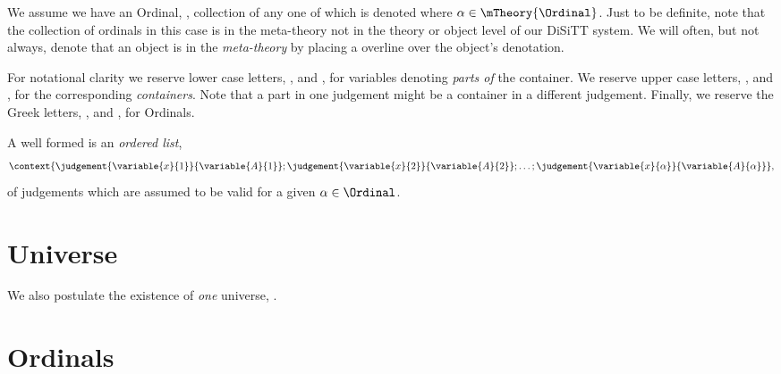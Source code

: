 \documentclass[a4paper,openany]{amsbook}
\begin{document}
We assume we have an Ordinal, \mTheory{\Ordinal}, collection of
 any one of which is denoted  where
$\alpha \in \mTheory{\Ordinal}$. Just to be definite, note that the collection
of ordinals in this case is in the meta-theory not in the theory or object level
of our DiSiTT system. We will often, but not always, denote that an object is in
the \emph{meta-theory} by placing a overline over the object's denotation.

For notational clarity we reserve lower case letters, ,
 and , for variables denoting \emph{parts of} the
container. We reserve upper case letters, ,  and
, for the corresponding \emph{containers}. Note that a part in one
judgement might be a container in a different judgement. Finally, we reserve the
Greek letters, \variable{\alpha}{}, \variable{\beta}{} and \variable{\gamma}{},
for Ordinals.

A well formed  is an \emph{ordered list}, %
\[\context{ %
 \judgement{\variable{x}{1}}{\variable{A}{1}} ; %
 \judgement{\variable{x}{2}}{\variable{A}{2}} ; %
 \ldots ; %
 \judgement{\variable{x}{\alpha}}{\variable{A}{\alpha}}
},\] %
of judgements which are assumed to be valid for a given $\alpha \in \Ordinal$.

\begin{deAxiom}
\conclusion{}{\cJudgement{\cdot}}
\end{deAxiom}

\begin{deAxiom}
\end{deAxiom}

\chapter{Universe}

We also postulate the existence of \emph{one} universe, \Universe{}. %
\begin{deAxiom} %
\conclusion{}{ %
  \Universe %
} %
\end{deAxiom} %

\chapter{Ordinals}
\end{document}
